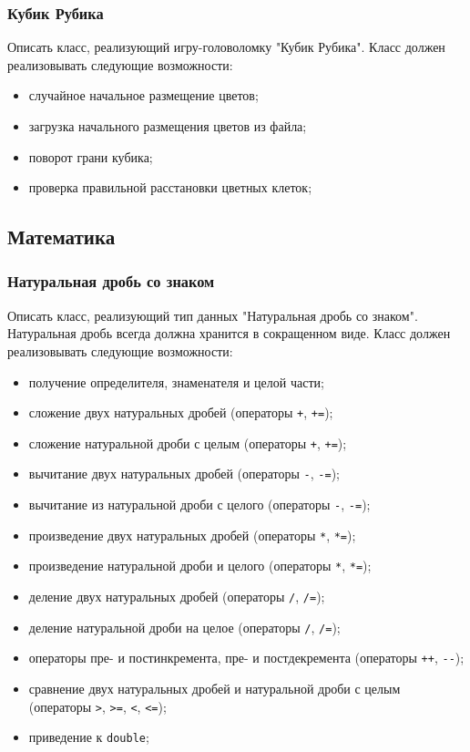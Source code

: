 \documentclass[a4paper,12pt]{article}
\begin{document}
\subsubsection{Кубик Рубика}

Описать класс, реализующий игру-головоломку "Кубик Рубика".  Класс
должен реализовывать следующие возможности:

\begin{itemize}
\item случайное начальное размещение цветов;
\item загрузка начального размещения цветов из файла;
\item поворот грани кубика;
\item проверка правильной расстановки цветных клеток;
\end{itemize}

\subsection{Математика}

\subsubsection{Натуральная дробь со знаком}

Описать класс, реализующий тип данных "Натуральная дробь со
знаком". Натуральная дробь всегда должна хранится в сокращенном виде.
Класс должен реализовывать следующие возможности:

\begin{itemize}
\item получение определителя, знаменателя и целой части;
\item сложение двух натуральных дробей (операторы \lstinline|+|,
  \lstinline|+=|);
\item сложение натуральной дроби с целым (операторы \lstinline|+|,
  \lstinline|+=|);
\item вычитание двух натуральных дробей (операторы \lstinline|-|,
  \lstinline|-=|);
\item вычитание из натуральной дроби с целого (операторы \lstinline|-|,
  \lstinline|-=|);
\item произведение двух натуральных дробей (операторы \lstinline|*|,
  \lstinline|*=|);
\item произведение натуральной дроби и целого (операторы \lstinline|*|,
  \lstinline|*=|);
\item деление двух натуральных дробей (операторы \lstinline|/|,
  \lstinline|/=|);
\item деление натуральной дроби на целое (операторы \lstinline|/|,
  \lstinline|/=|);
\item операторы пре- и постинкремента, пре- и постдекремента
  (операторы \lstinline|++|, \lstinline|--|);
\item сравнение двух натуральных дробей и натуральной дроби с целым
  (операторы \lstinline|>|, \lstinline|>=|, \lstinline|<|,
  \lstinline|<=|);
\item приведение к \lstinline|double|;
\end{itemize}
\end{document}
